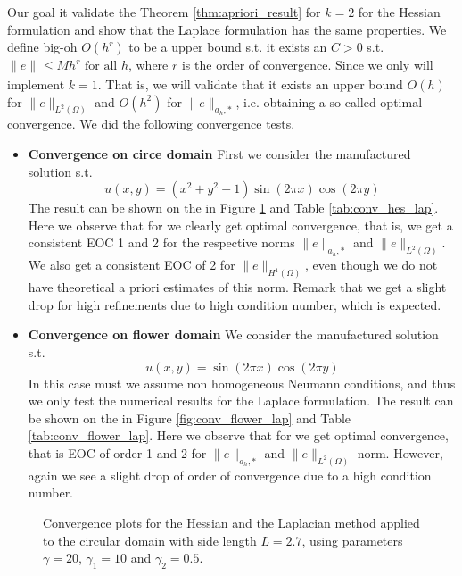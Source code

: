 Our goal it validate the Theorem \ref{thm:apriori_result} for $k= 2$ for the Hessian formulation and show that the Laplace formulation has the same properties.
We define big-oh $O( h^{r})$ to be a upper bound s.t. it exists an $C>0$ s.t.  $\| e \|_{  }^{  } \le M h^{r} \text{ for all } h$, where $r$ is the order of convergence. Since we only will implement $k=1$.
That is, we will validate that it exists an upper bound $ O( h)  $ for  $\| e \|_{L^{2}( \Omega )   }^{  }$  and $O( h^2)  $ for $\| e \|_{ a_{h},* }^{  } $, i.e. obtaining a so-called optimal convergence.
We did the following convergence tests.
\begin{itemize}
    \item \textbf{Convergence on circe domain}
        First we consider the manufactured solution s.t.
        \begin{equation}
        \label{eq:man_sol_1}
            u(x,y) = (x^2+ y^2 -1) \sin\left(2 \pi x \right)\cos\left(2\pi y\right)
        \end{equation}
        The result can be shown on the in Figure \ref{fig:conv_hes_lap} and Table \ref{tab:conv_hes_lap}. Here we observe that for we clearly get optimal convergence, that is, we get a consistent EOC 1 and 2 for the respective norms $\| e  \|_{a_{h},*  }^{  } $
        and $\| e  \|_{L^2( \Omega )   }^{  } $.  We also get a consistent EOC of 2 for $\| e \|_{ H^{1}(\Omega  )  }^{  } $, even though we do not have theoretical a priori estimates of this norm.
Remark that we get a slight drop for high refinements due to high condition number, which is expected.
    \item \textbf{Convergence on flower domain}
        We consider the manufactured solution s.t.
        \begin{equation}
        \label{eq:man_sol_2}
            u(x,y) =  \sin\left( 2\pi x \right)\cos\left(2\pi y\right)
        \end{equation}
        In this case must we assume non homogeneous Neumann conditions, and thus we only test the numerical results for the Laplace formulation. The result can be shown on the in Figure \ref{fig:conv_flower_lap} and Table \ref{tab:conv_flower_lap}. Here we
        observe that for we get optimal convergence, that is EOC of order 1 and 2 for $\| e  \|_{a_{h},*  }^{  } $ and  $ \| e  \|_{L^{2}( \Omega )   }^{  } $ norm. However, again we see a slight drop of order of convergence due to a high condition number.
\end{itemize}

\begin{figure}[h!]
\centering
\subfloat[Hessian]{}
\subfloat[Laplace]{}

\caption{ Convergence plots for the Hessian and the Laplacian method applied to the circular domain with side length $L=2.7$, using parameters $\gamma=20$, $\gamma_1=10$ and $\gamma_2= 0.5$.}
\label{fig:conv_hes_lap}
\end{figure}



